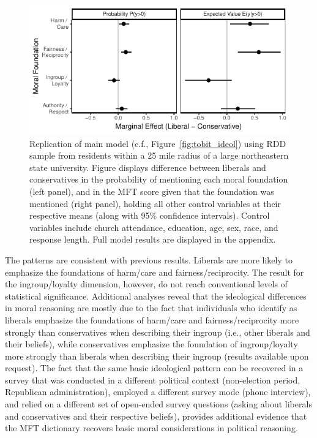 \documentclass[12pt]{article}
\begin{document}
\begin{figure}[ht]\centering
\includegraphics{../calc/fig/tobit_ideol_lisurvey.pdf}
\caption{Replication of main model (c.f., Figure~\ref{fig:tobit_ideol}) using RDD sample from residents within a 25 mile radius of a large northeastern  state university. Figure displays difference between liberals and conservatives in the probability of mentioning each moral foundation (left panel), and in the MFT score given that the foundation was mentioned (right panel), holding all other control variables at their respective means (along with 95\% confidence intervals). Control variables include church attendance, education, age, sex, race, and response length. Full model results are displayed in the appendix.
}\label{fig:tobit_ideol_lisurvey}
\end{figure}

The patterns are consistent with previous results. Liberals are more likely to emphasize the foundations of harm/care and fairness/reciprocity. The result for the ingroup/loyalty dimension, however, do not reach conventional levels of statistical significance. Additional analyses reveal that the ideological differences in moral reasoning are mostly due to the fact that individuals who identify as liberals emphasize the foundations of harm/care and fairness/reciprocity more strongly than conservatives when describing their ingroup (i.e., other liberals and their beliefs), while conservatives emphasize the foundation of ingroup/loyalty more strongly than liberals when describing their ingroup (results available upon request). The fact that the same basic ideological pattern can be recovered in a survey that was conducted in a different political context (non-election period, Republican administration), employed a different survey mode (phone interview), and relied on a different set of open-ended survey questions (asking about liberals and conservatives and their respective beliefs), provides additional evidence that the MFT dictionary recovers basic moral considerations in political reasoning.
\end{document}
